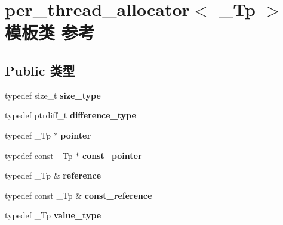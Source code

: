 \hypertarget{classper__thread__allocator}{}\section{per\+\_\+thread\+\_\+allocator$<$ \+\_\+\+Tp $>$ 模板类 参考}
\label{classper__thread__allocator}
\subsection*{Public 类型}
\begin{DoxyCompactItemize}
\item 
\mbox{\label{classper__thread__allocator_aca7ab8927eff1181c231c5636ed6935a}} 
typedef size\+\_\+t {\bfseries size\+\_\+type}
\item 
\mbox{\label{classper__thread__allocator_a3dbd412882d535d45b52765b3c3b305e}} 
typedef ptrdiff\+\_\+t {\bfseries difference\+\_\+type}
\item 
\mbox{\label{classper__thread__allocator_ad2e64fdfc2c1ea82e08658f8b5814589}} 
typedef \+\_\+\+Tp $\ast$ {\bfseries pointer}
\item 
\mbox{\label{classper__thread__allocator_a554d7e6980483c321003bcc5beddb024}} 
typedef const \+\_\+\+Tp $\ast$ {\bfseries const\+\_\+pointer}
\item 
\mbox{\label{classper__thread__allocator_a6e0559615d2cb17b886d6cd55b53f88f}} 
typedef \+\_\+\+Tp \& {\bfseries reference}
\item 
\mbox{\label{classper__thread__allocator_a2e291e8f27d53939bcfcbcee2d083216}} 
typedef const \+\_\+\+Tp \& {\bfseries const\+\_\+reference}
\item 
\mbox{\label{classper__thread__allocator_ab1167e43713c6ae461390664b7252953}} 
typedef \+\_\+\+Tp {\bfseries value\+\_\+type}
\end{DoxyCompactItemize}
